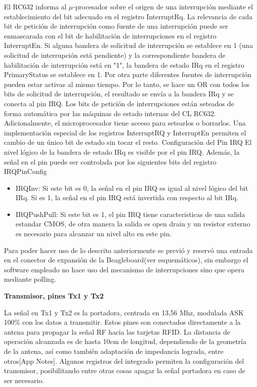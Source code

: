 El RC632 informa al $\mu$-procesador sobre el origen de una interrupción mediante el establecimiento del bit adecuado en el registro InterruptRq. La relevancia de cada bit de petición de interrupción como fuente de una interrupción puede ser enmascarada con el bit de habilitación de interrupciones en el registro InterruptEn. 
Si alguna bandera de solicitud de interrupción se establece en 1 (una solicitud de interrupción está pendiente) y la correspondiente bandera de habilitación de interrupción está en "1", la bandera de estado IRq en el registro PrimaryStatus se establece en 1. 
Por otra parte diferentes fuentes de interrupción pueden estar activas al mismo tiempo. Por lo tanto, se hace un OR con todos los bits de solicitud de interrupción, el resultado se envía a la bandera IRq y se conecta al pin IRQ. 
Los bits de petición de interrupciones están seteados de forma automática por las máquinas de estado internas del CL RC632. Adicionalmente, el microprocesador tiene acceso para setearlos o borrarlos. 
Una implementación especial de los registros InterruptRQ y InterruptEn permiten el cambio de un único bit de estado sin tocar el resto. 
Configuración del Pin IRQ 
El nivel lógico de la bandera de estado IRq es visible por el pin IRQ. Además, la señal en el pin puede ser controlada por los siguientes bits del registro IRQPinConfig 
\begin{itemize}
\item IRQInv: 	   Si este bit es 0, la señal en el pin IRQ es igual al nivel lógico del bit IRq. 
		  	   Si es 1, la señal en el pin IRQ está invertida con respecto al bit IRq. 
\item IRQPushPull:  Si este bit es 1, el pin IRQ tiene caracteristicas de una salida estandar 				   CMOS, de otra manera la salida es open drain y un resistor externo es 				   necesario para alcanzar un nivel alto en este pin. 
\end{itemize}

Para poder hacer uso de lo descrito anteriormente se previó y reservó una entrada en el conector de expansión de la Beagleboard(ver esquemáticos), sin embargo el software empleado no hace uso del mecanismo de interrupciones sino que opera mediante polling.


{\bf{Transmisor, pines Tx1 y Tx2}}

La señal en Tx1 y Tx2 es la portadora, centrada en 13,56 Mhz, modulada ASK 100\% con los datos a transmitir. Estos pines son conectados directamente a la antena para propagar la señal RF hacia las tarjetas RFID. La distancia de operación alcanzada es de hasta 10cm de longitud, dependiendo de la geometría de la antena, así como también adaptación de impedancia lograda, entre otros[App Notes].
Algunos registros del integrado permiten la configuración del transmisor, posibilitando entre otras cosas apagar la señal portadora en caso de ser necesario.

